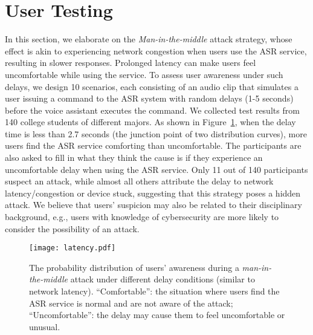 \section{User Testing}\label{append:user_test}
In this section, we elaborate on the \textit{Man-in-the-middle} attack strategy, whose effect is akin to experiencing network congestion when users use the ASR service, resulting in slower responses. Prolonged latency can make users feel uncomfortable while using the service. 
To assess user awareness under such delays, we design 10 scenarios, each consisting of an audio clip that simulates a user issuing a command to the ASR system with random delays (1-5 seconds) before the voice assistant executes the command. 
We collected test results from 140 college students of different majors. As shown in Figure~\ref{fig:user_latency}, when the delay time is less than 2.7 seconds (the junction point of two distribution curves), more users find the ASR service comforting than uncomfortable. 
The participants are also asked to fill in what they think the cause is if they experience an uncomfortable delay when using the ASR service.
Only 11 out of 140 participants suspect an attack, while almost all others attribute the delay to network latency/congestion or device stuck, suggesting that this strategy poses a hidden attack.
We believe that users' suspicion may also be related to their disciplinary background, e.g., users with knowledge of cybersecurity are more likely to consider the possibility of an attack.

\begin{figure}[h]
    \centering
    \texttt{[image: latency.pdf]}
    \caption{The probability distribution of users' awareness during a \textit{man-in-the-middle} attack under different delay conditions (similar to network latency). ``Comfortable'': the situation where users find the ASR service is normal and are not aware of the attack; ``Uncomfortable'': the delay may cause them to feel uncomfortable or unusual.}
    \label{fig:user_latency}
\end{figure}

